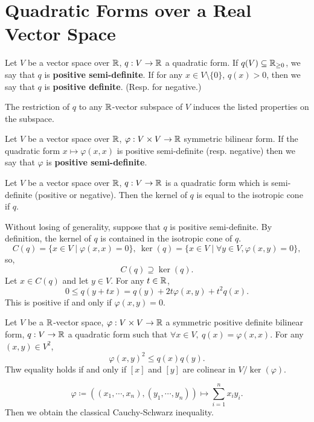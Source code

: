 \section{Quadratic Forms over a Real Vector Space}
\begin{definitionenv}
    Let $V$ be a vector space over $\mathbb{R}$, $q: V\rightarrow \mathbb{R}$ a quadratic form. If $q(V) \subseteq \mathbb{R}_{\ge 0}$, we say that $q$ is \textbf{positive semi-definite}. If for any $x\in V\setminus\{0\}$, $q(x)>0$, then we say that $q$ is \textbf{positive definite}. (Resp. for negative.)

    \quad The restriction of $q$ to any $\mathbb{R}$-vector subspace of $V$ induces the listed properties on the subspace.
\end{definitionenv}
\begin{definitionenv}
    Let $V$ be a vector space over $\mathbb{R}$, $\varphi: V\times V\rightarrow \mathbb{R}$ symmetric bilinear form.
    If the quadratic form $x\mapsto \varphi(x,x)$ is positive semi-definite (resp. negative) then we say that $\varphi$ is \textbf{positive semi-definite}.
\end{definitionenv}
\begin{lemmaenv}\label{2.4.3}
    Let $V$ be a vector space over $\mathbb{R}$, $q:V\rightarrow \mathbb{R}$ is a quadratic form which is semi-definite (positive or negative).
    Then the kernel of $q$ is equal to the isotropic cone if $q$.
\end{lemmaenv}
\begin{proofenv}
    Without losing of generality, suppose that $q$ is positive semi-definite. By definition, the kernel of $q$ is contained in the isotropic cone of $q$.
    $$ C(q) = \{ x\in V\mid \varphi(x,x) = 0 \},\ \ker(q) = \{x\in V\mid \forall y\in V, \varphi(x,y) = 0\},$$
    so,
    $$ C(q) \supseteq \ker(q).$$
    Let $x\in C(q)$ and let $y\in V$. For any $t\in\mathbb{R}$,
    $$ 0\le q(y+ tx)  = q (y) + 2t\varphi(x,y) + t^2 q(x).$$
    This is positive if and only if $\varphi(x,y) = 0.$
\end{proofenv}
\begin{theoremenv}
    Let $V$ be a $\mathbb{R}$-vector space, $\varphi:V\times V\rightarrow \mathbb{R}$ a symmetric positive definite bilinear form, $q : V\rightarrow \mathbb{R}$ a quadratic form such that $\forall x\in V,\ q(x) = \varphi(x,x).$
    For any $(x,y)\in V^2$,
    $$ \varphi(x,y)^2 \le q(x)q(y).$$
    Thw equality holds if and only if $[x]$ and $[y]$ are colinear in $V/\ker(\varphi)$.
\end{theoremenv}
\begin{remark}
    $$\varphi \coloneq \left((x_1,\cdots,x_n),(y_1,\cdots,y_n)\right)\mapsto \sum_{i=1}^{n}x_iy_i.$$
    Then we obtain the classical Cauchy-Schwarz inequality.
\end{remark}
